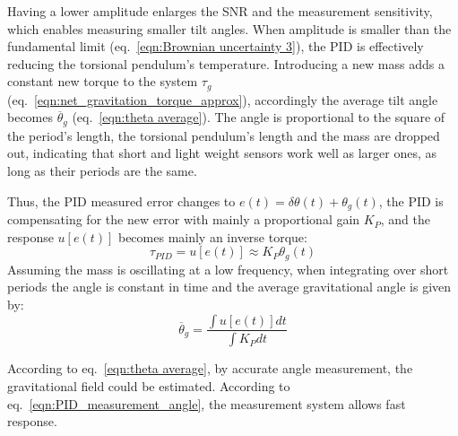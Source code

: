 \documentclass[\main/master.tex]{subfiles}
\begin{document}
\par\noindent
Having a lower amplitude enlarges the SNR and the measurement sensitivity, which enables measuring smaller tilt angles. When amplitude is smaller than the fundamental limit (eq.~\ref{eqn:Brownian uncertainty 3}), the PID is effectively reducing the torsional pendulum's temperature. Introducing a new mass adds a constant new torque to the system $\tau_g$ (eq.~\ref{eqn:net_gravitation_torque_approx}), accordingly the average tilt angle becomes $\overline{\theta}_g$ (eq.~\ref{eqn:theta average}). The angle is proportional to the square of the period's length, the torsional pendulum's length and the mass are dropped out, indicating that short and light weight sensors work well as larger ones, as long as their periods are the same. 
\par\noindent
Thus, the PID measured error  changes to $e(t) = \delta\theta(t) + \theta_g(t)$, the PID is compensating for the new error with mainly a proportional gain $K_P$, and the response $u[e(t)]$ becomes mainly an inverse torque:
\begin{equation}
\tau_{PID} = u[e(t)] \approx K_P\theta_g(t) 
\label{eqn:PID_response}
\end{equation}
Assuming the mass is oscillating at a low frequency, when integrating over short periods the angle is constant in time and the average gravitational angle is given by:
\begin{equation}
\overline{\theta}_g = \frac{\int u[e(t)] dt}{\int K_P dt}
\label{eqn:PID_measurement_angle}
\end{equation}
\par\noindent
According to eq.~\ref{eqn:theta average}, by accurate angle measurement, the gravitational field could be estimated. According to eq.~\ref{eqn:PID_measurement_angle}, the measurement system allows fast response. 
\end{document}
